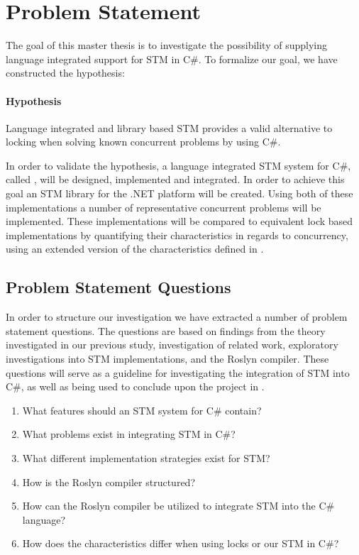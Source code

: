\section{Problem Statement}\label{sec:problem_statement}
The goal of this master thesis is to investigate the possibility of supplying language integrated support for \ac{STM} in C\#. To formalize our goal, we have constructed the hypothesis:

\paragraph{Hypothesis} Language integrated and library based \ac{STM} provides a valid alternative to locking when solving known concurrent problems by using C\#.


In order to validate the hypothesis, a language integrated \ac{STM} system for C\#, called \stmname, will be designed, implemented and integrated. In order to achieve this goal an \ac{STM} library for the .NET platform will be created. Using both of these implementations a number of representative concurrent problems will be implemented. These implementations will be compared to equivalent lock based implementations by quantifying their characteristics in regards to concurrency, using an extended version of the characteristics defined in \cite[p. 16-21]{dpt907e14trending}.

\subsection{Problem Statement Questions}
In order to structure our investigation we have extracted a number of problem statement questions. The questions are based on findings from the theory investigated in our previous study\cite{dpt907e14trending}, investigation of related work, exploratory investigations into \ac{STM} implementations, and the Roslyn compiler. These questions will serve as a guideline for investigating the integration of \ac{STM} into C\#, as well as being used to conclude upon the project in .

\begin{enumerate}
\item What features should an \ac{STM} system for C\# contain?
\item What problems exist in integrating \ac{STM} in C\#?
\item What different implementation strategies exist for \ac{STM}?
\item How is the Roslyn compiler structured?
\item How can the Roslyn compiler be utilized to integrate \ac{STM} into the C\# language?
\item How does the characteristics differ when using locks or our \ac{STM} in C\#?
\end{enumerate}

